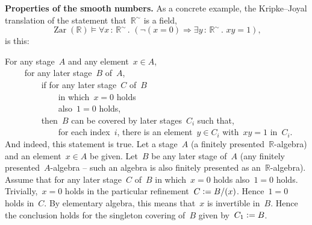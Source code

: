 \documentclass[graybox]{svmult}
\newenvironment{indentblock}{%
  \list{}{\leftmargin\leftmargin}%
  \item\relax
}{%
  \endlist
}
\newcommand{\RR}{\mathbb{R}}
\newcommand{\defeq}{\vcentcolon=}
\DeclareMathOperator{\Zar}{Zar}
\renewcommand{\_}{\mathpunct{.}\,}
\newcommand{\?}{\,{:}\,}
\renewcommand{\paragraph}[1]{\noindent\textbf{#1.}}
\begin{document}
\paragraph{Properties of the smooth numbers}\label{page:field-property}
As a concrete example, the Kripke--Joyal translation of the statement that~$\RR^\sim$ is a field,
\[ \Zar(\RR) \models \forall x\?\RR^\sim\_ (\neg(x = 0) \Rightarrow \exists y\?\RR^\sim\_ xy = 1), \]
is this:
\begin{indentblock}
For any stage~$A$ and any element~$x \in A$, \\
${\qquad}$ for any later stage~$B$ of~$A$, \\
${\qquad\qquad}$ if for any later stage~$C$ of~$B$ \\
${\qquad\qquad\qquad}$ in which~$x = 0$ holds \\
${\qquad\qquad\qquad}$ also~$1 = 0$ holds, \\
${\qquad\qquad}$ then~$B$ can be covered by later stages~$C_i$ such that, \\
${\qquad\qquad\qquad}$ for each
index~$i$, there is an element~$y \in C_i$ with~$xy = 1$ in~$C_i$.
\end{indentblock}
And indeed, this statement is true. Let a stage~$A$ (a finitely
presented~$\RR$-algebra) and an element~$x \in A$
be given. Let~$B$ be any later stage of~$A$ (any finitely
presented~$A$-algebra -- such an algebra is also finitely presented as
an~$\RR$-algebra). Assume that for any later stage~$C$ of~$B$ in which~$x = 0$
holds also~$1 = 0$ holds. Trivially,~$x = 0$ holds in the particular refinement~$C \defeq B/(x)$.
Hence~$1 = 0$ holds in~$C$. By elementary algebra, this means that~$x$ is
invertible in~$B$. Hence the conclusion holds for the singleton covering
of~$B$ given by~$C_1 \defeq B$.
\end{document}
